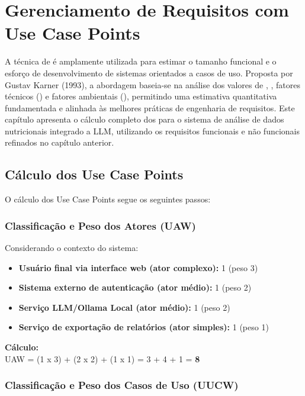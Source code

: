 \chapter{Gerenciamento de Requisitos com Use Case Points}\label{cap:8-ger-req-use-case-points}

A técnica de  é amplamente utilizada para estimar o tamanho funcional e o esforço de desenvolvimento de sistemas orientados a casos de uso. Proposta por Gustav Karner (1993), a abordagem baseia-se na análise dos valores de , , fatores técnicos () e fatores ambientais (), permitindo uma estimativa quantitativa fundamentada e alinhada às melhores práticas de engenharia de requisitos. Este capítulo apresenta o cálculo completo dos  para o sistema de análise de dados nutricionais integrado a LLM, utilizando os requisitos funcionais e não funcionais refinados no capítulo anterior.

\section{Cálculo dos Use Case Points}

O cálculo dos Use Case Points segue os seguintes passos:

\subsection{Classificação e Peso dos Atores (UAW)}

Considerando o contexto do sistema:
\begin{itemize}
    \item \textbf{Usuário final via interface web (ator complexo):} 1 (peso 3)
    \item \textbf{Sistema externo de autenticação (ator médio):} 1 (peso 2)
    \item \textbf{Serviço LLM/Ollama Local (ator médio):} 1 (peso 2)
    \item \textbf{Serviço de exportação de relatórios (ator simples):} 1 (peso 1)
\end{itemize}

\textbf{Cálculo:}
\\
UAW = (1 x 3) + (2 x 2) + (1 x 1) = 3 + 4 + 1 = \textbf{8}

\subsection{Classificação e Peso dos Casos de Uso (UUCW)}


